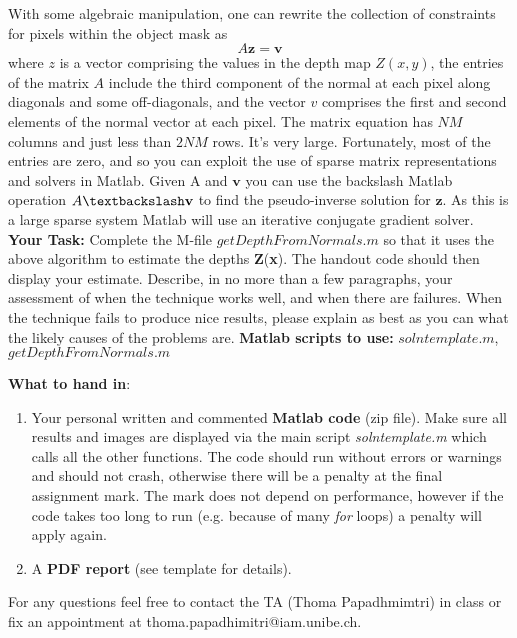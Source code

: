 \documentclass{paper}
\begin{document}
With some algebraic manipulation, one can rewrite the collection of constraints for pixels within the object mask as
\begin{equation}
A\textbf{z}=\textbf{v}
\end{equation}
where $z$ is a vector comprising the values in the depth map $Z(x,y)$, the entries of the matrix $A$ include the third component of the normal at each pixel along diagonals and some off-diagonals, and the vector $v$ comprises the first and second elements of the normal vector at each pixel. The matrix equation has $NM$ columns and just less than $2NM$ rows. It's very large. Fortunately, most of the entries are zero, and so you can exploit the use of sparse matrix representations and solvers in Matlab. Given A and $\textbf{v}$ you can use the backslash Matlab operation $A\textbackslash \textbf{v}$ to find the pseudo-inverse solution for $\textbf{z}$. As this is a large sparse system Matlab will use an iterative conjugate gradient solver.\newline
\textbf{Your Task: }Complete the M-file $getDepthFromNormals.m$ so that it uses the above algorithm to estimate the depths \textbf{Z}(\textbf{x}). The handout code should then display your estimate. Describe, in no more than a few paragraphs, your assessment of when the technique works well, and when there are failures. When the technique fails to produce nice results, please explain as best as you can what the likely causes of the problems are.\newline
\textbf{Matlab scripts to use:} $solntemplate.m$, $getDepthFromNormals.m$



\textbf{What to hand in}: 


\begin{enumerate}

\item Your personal written and commented \textbf{Matlab code} (zip file). Make sure all results and images are displayed via the main script \textit{solntemplate.m} which calls all the other functions. The code should run without errors or warnings and should not crash, otherwise there will be a penalty at the final assignment mark. The mark does not depend on performance, however if the code takes too long to run (e.g. because of many \textit{for} loops) a penalty will apply again.

\item A \textbf{PDF report} (see template for details). 


\end{enumerate}

For any questions feel free to contact the TA (Thoma Papadhmimtri) in class or fix an appointment at thoma.papadhimitri@iam.unibe.ch.












 
\end{document}
